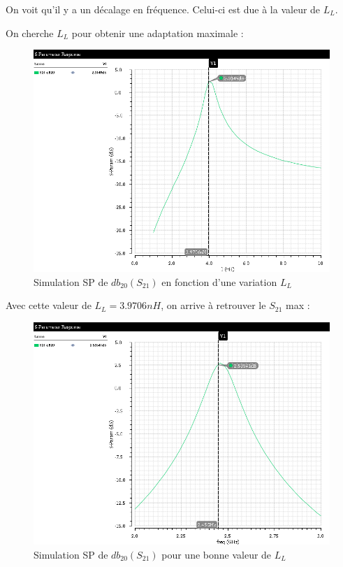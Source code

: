\documentclass[a4paper]{article}
\begin{document}
On voit qu'il y a un d\'ecalage en fr\'equence. Celui-ci est due \`a la valeur de $L_L$.

On cherche $L_L$ pour obtenir une adaptation maximale :

\begin{figure}[!htb]
\begin{center}
  \includegraphics[scale=0.45]{Q4-S21-newL_l.png}
  \caption{Simulation SP de $db_{20} (S_{21})$ en fonction d'une variation $L_L$ }
  \label{newLL}
\end{center}
\end{figure}

\clearpage

Avec cette valeur de $L_L = 3.9706 nH$, on arrive \`a retrouver le $S_{21}$ max :

\begin{figure}[!htb]
\begin{center}
  \includegraphics[scale=0.45]{Q4-S21db20-newL_l.png}
  \caption{Simulation SP de $db_{20} (S_{21})$ pour une bonne valeur de $L_L$}
  \label{s21-sp-sim-newll}
\end{center}
\end{figure}
\end{document}
